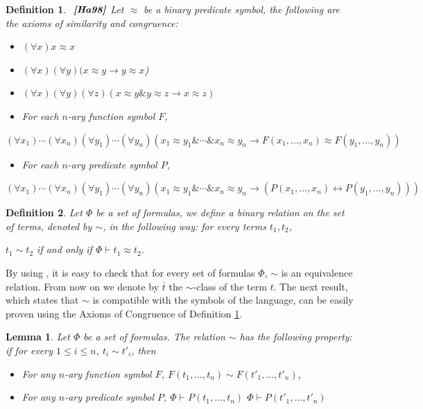 \documentclass{IOS-Book-Article}
\newtheorem{lemma}{Lemma}
\newtheorem{defi}{Definition}
\begin{document}
\begin{defi} $\emph{\textbf{ \cite[Definitions 5.6.1, 5.6.5]{Ha98}}}$ \label{def similarity} 
Let $\approx$ be a binary predicate symbol, the following are the axioms of similarity and congruence: 
\begin{itemize}

\item[S1.] $(\forall x)x\approx x$ 

\item[S2.] $(\forall x)(\forall y)(x\approx y\rightarrow y\approx x$) 

\item[S3.] $(\forall x)(\forall y)(\forall z)(x\approx y \& y\approx z\rightarrow x\approx z)$  \end{itemize} 
\begin{itemize}
\item[C1.]  For each $n$-ary function symbol  $F$, \end{itemize} {\footnotesize
$(\forall x_1)\dotsb(\forall x_n)(\forall y_1)\dotsb(\forall y_n)(x_1\approx y_1\&\dotsb \& x_n\approx y_n\rightarrow F(x_1,\ldots,x_n)\approx F(y_1,\ldots,y_n))$
}
\begin{itemize}
\item[C2.]  For each $n$-ary predicate symbol  $P$, \end{itemize} {\footnotesize 
$(\forall x_1)\dotsb(\forall x_n)(\forall y_1)\dotsb(\forall y_n)(x_1\approx y_1\&\dotsb \& x_n\approx y_n\rightarrow (P(x_1, \ldots, x_n)\leftrightarrow P(y_1,\ldots, y_n)))$ }
\end{defi}

\begin{defi}\label{relacio}   
Let $\Phi$ be a set of formulas, we define a binary relation on the set of terms, denoted by $\sim$, in the following way: for every terms $t_1,t_2$,
\begin{center}
$t_1\sim t_2$ if and only if $\Phi\vdash t_1\approx t_2$. 
\end{center}
\end{defi}

By using \cite[Prop.1(5)]{EsGo01}, it is easy to check that for every set of formulas $\Phi$, $\sim$ is an equivalence relation. From now on we denote by $\overline{t}$ the $\sim$-class of the term $t$. The next result, which states that $\sim$ is compatible with the symbols of the language, can be easily proven using the Axioms of Congruence of Definition \ref{def similarity}.

\begin{lemma} \label{f} Let $\Phi$ be a set of formulas. The relation $\sim$ has the following property: if for every $1\leq i\leq n$, $t_i\sim t'_i$, then 

  \begin{itemize}
 \item[(i)] For any $n$-ary function symbol $F$, $F(t_1,\ldots,t_n)\sim F(t'_1,\ldots,t'_n)$,  

\item[(ii)] For any $n$-ary predicate symbol $P$, \small{
$\Phi\vdash P(t_1,\ldots, t_n)$  $\Phi\vdash P(t'_1, \ldots, t'_n)$}
\end{itemize}
\end{lemma}
\end{document}
